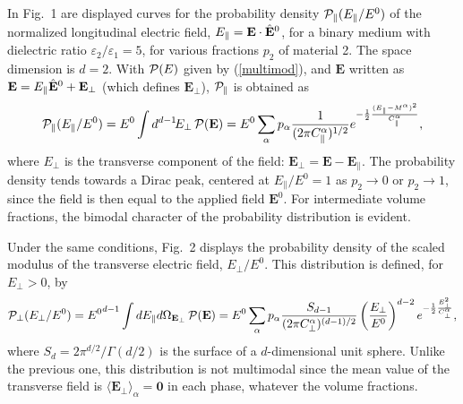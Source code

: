 In Fig.\ 1 are displayed curves for the probability density 
${\cal P}_\parallel(E_\parallel/E^0)$ 
of the normalized longitudinal electric field, 
$E_\parallel={\bf E}\cdot \hat{\bf E}^0$, 
for a binary medium with dielectric ratio 
$\varepsilon_2/\varepsilon_1=5$, 
for various fractions $p_2$ 
of material 2. The space dimension is $d=2$. 
With ${\cal P}(E)$ given by (\ref{multimod}), and 
${\mathbf E}$ written as 
${\mathbf E}= E_\parallel\hat{\bf E}^0+{\mathbf E}_\perp$ 
(which defines ${\mathbf E}_\perp$), 
${\cal P}_\parallel$ is obtained as
\begin{equation}
{\cal P}_\parallel(E_\parallel/E^0)
=E^0\int d^{d-1}\! E_\perp\, 
{\cal P}({\mathbf E})
=E^0 \sum_\alpha p_\alpha 
\frac{1}{(2\pi C^\alpha_\parallel)^{1/2}}
e^{-\frac{1}{2} \frac{(E_\parallel-M^\alpha)^2}{C^\alpha_\parallel}},
\end{equation}
where $E_\perp$ is the transverse component of the field: 
${\mathbf{E}}_\perp={\mathbf{E}}-{\mathbf{E}}_\parallel$. 
The probability density tends towards a Dirac peak, centered 
at $E_\parallel/E^0=1$ as $p_2\to 0$ or $p_2\to 1$, since 
the field is then equal to the applied field ${\mathbf E}^0$. 
For intermediate volume fractions, the bimodal character of 
the probability distribution is evident. 

Under the same conditions, Fig.\ 2 displays the probability 
density of the scaled modulus of the transverse electric field, 
$E_\perp/E^0$. This distribution is defined, for $E_\perp>0$, 
by
\begin{equation}
{\cal P}_\perp(E_\perp/E^0)={E^0}^{d-1}\int dE_\parallel 
d\Omega_{{\mathbf E}_\perp}\, {\cal P}({\mathbf E})=
E^0 \sum_\alpha p_\alpha \frac{S_{d-1}}
{(2\pi C^\alpha_\perp)^{(d-1)/2}}\left(\frac{E_\perp}
{E^0}\right)^{d-2}e^{-\frac{1}{2} \frac{E_\perp^2}
{C^\alpha_\perp}},
\end{equation}
where $S_d=2\pi^{d/2}/\Gamma(d/2)$ is the surface of a 
$d$-dimensional unit sphere. Unlike the previous one, 
this distribution is not multimodal since the mean value 
of the transverse field is $\langle {\mathbf E}_\perp\rangle_\alpha
={\mathbf 0}$ in each phase, whatever the volume fractions. 

